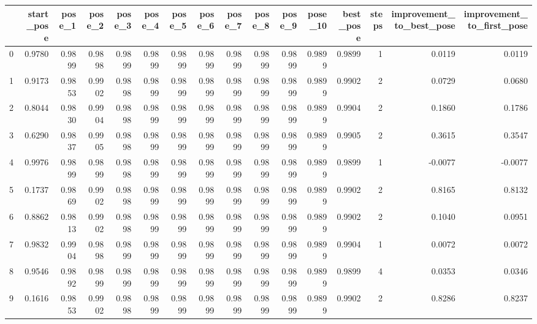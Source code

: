\begin{tabular}{lrrrrrrrrrrrrrrr}
\toprule
{} &  start\_pose &  pose\_1 &  pose\_2 &  pose\_3 &  pose\_4 &  pose\_5 &  pose\_6 &  pose\_7 &  pose\_8 &  pose\_9 &  pose\_10 &  best\_pose &  steps &  improvement\_to\_best\_pose &  improvement\_to\_first\_pose \\
\midrule
0   &      0.9780 &  0.9899 &  0.9898 &  0.9899 &  0.9899 &  0.9899 &  0.9899 &  0.9899 &  0.9899 &  0.9899 &   0.9899 &     0.9899 &      1 &                    0.0119 &                     0.0119 \\
1   &      0.9173 &  0.9853 &  0.9902 &  0.9898 &  0.9899 &  0.9899 &  0.9899 &  0.9899 &  0.9899 &  0.9899 &   0.9899 &     0.9902 &      2 &                    0.0729 &                     0.0680 \\
2   &      0.8044 &  0.9830 &  0.9904 &  0.9898 &  0.9899 &  0.9899 &  0.9899 &  0.9899 &  0.9899 &  0.9899 &   0.9899 &     0.9904 &      2 &                    0.1860 &                     0.1786 \\
3   &      0.6290 &  0.9837 &  0.9905 &  0.9898 &  0.9899 &  0.9899 &  0.9899 &  0.9899 &  0.9899 &  0.9899 &   0.9899 &     0.9905 &      2 &                    0.3615 &                     0.3547 \\
4   &      0.9976 &  0.9899 &  0.9899 &  0.9898 &  0.9899 &  0.9899 &  0.9899 &  0.9899 &  0.9899 &  0.9899 &   0.9899 &     0.9899 &      1 &                   -0.0077 &                    -0.0077 \\
5   &      0.1737 &  0.9869 &  0.9902 &  0.9898 &  0.9899 &  0.9899 &  0.9899 &  0.9899 &  0.9899 &  0.9899 &   0.9899 &     0.9902 &      2 &                    0.8165 &                     0.8132 \\
6   &      0.8862 &  0.9813 &  0.9902 &  0.9898 &  0.9899 &  0.9899 &  0.9899 &  0.9899 &  0.9899 &  0.9899 &   0.9899 &     0.9902 &      2 &                    0.1040 &                     0.0951 \\
7   &      0.9832 &  0.9904 &  0.9898 &  0.9899 &  0.9899 &  0.9899 &  0.9899 &  0.9899 &  0.9899 &  0.9899 &   0.9899 &     0.9904 &      1 &                    0.0072 &                     0.0072 \\
8   &      0.9546 &  0.9892 &  0.9899 &  0.9899 &  0.9899 &  0.9899 &  0.9899 &  0.9899 &  0.9899 &  0.9899 &   0.9899 &     0.9899 &      4 &                    0.0353 &                     0.0346 \\
9   &      0.1616 &  0.9853 &  0.9902 &  0.9898 &  0.9899 &  0.9899 &  0.9899 &  0.9899 &  0.9899 &  0.9899 &   0.9899 &     0.9902 &      2 &                    0.8286 &                     0.8237 \\

\end{tabular}
